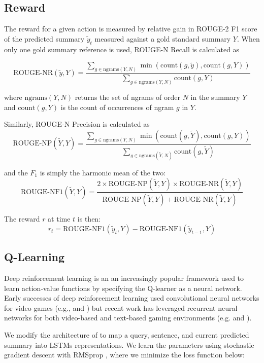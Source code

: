 \documentclass[12pt]{article}
\begin{document}
\subsection{Reward} 
The reward for a given action is measured by relative gain in ROUGE-2 F1 score of the predicted summary $\tilde{y}_{t}$ measured against a gold standard summary $Y$. When only one gold summary reference is used, ROUGE-N Recall is calculated as 

\[ \textrm{ROUGE-NR}(\tilde{y}, Y) = 
    \frac{\sum_{g \in \textrm{ngrams}(Y,N)} 
    \min \left(\textrm{count}(g, \tilde{y}), \textrm{count}(g, Y)\right)}{
    \sum_{g \in \textrm{ngrams}(Y,N)} 
    \textrm{count}(g, Y)
    }
\]

where $\textrm{ngrams}(Y, N)$ returns the set of ngrams of order $N$ in the summary $Y$ and $\textrm{count}(g, Y)$ is the count of occurrences of ngram $g$ in $Y.$

Similarly, ROUGE-N Precision is calculated as 
\[ \textrm{ROUGE-NP}(\tilde{Y}, Y) = 
    \frac{\sum_{g \in \textrm{ngrams}(Y,N)} 
    \min \left(\textrm{count}(g, \tilde{Y}), \textrm{count}(g, Y)\right)}{
        \sum_{g \in \textrm{ngrams}(\tilde{Y},N)} 
        \textrm{count}(g, \tilde{Y})
    }
\]

and the $F_1$ is simply the harmonic mean of the two:
\[ \textrm{ROUGE-NF1}(\tilde{Y}, Y) = \frac{ 2 \times 
\textrm{ROUGE-NP}(\tilde{Y}, Y) \times \textrm{ROUGE-NR}(\tilde{Y}, Y)
}{ \textrm{ROUGE-NP}(\tilde{Y}, Y) + \textrm{ROUGE-NR}(\tilde{Y}, Y) } \]


The reward $r$ at time $t$ is then:
\[ r_t = \textrm{ROUGE-NF1}(\tilde{y}_{t}, Y) - 
\textrm{ROUGE-NF1}(\tilde{y}_{t-1}, Y) \]

\subsection{Q-Learning}

Deep reinforcement learning is an an increasingly popular framework used to learn action-value functions by specifying the Q-learner as a neural network. Early successes of deep reinforcement learning used convolutional neural networks for video games (e.g., \cite{MnihBMGLHSK16} and \cite{MnihKSGAWR13}) but recent work has leveraged recurrent neural networks for both video-based and text-based gaming environments (e.g. \cite{hausknecht2015deep} and \cite{narasimhan2015language}). 

We modify the architecture of \cite{narasimhan2015language} to map a query, sentence, and current predicted summary into LSTMs representations. We learn the parameters using stochastic gradient descent with RMSprop \cite{hinton2012lecture}, where we minimize the loss function below: 
\end{document}
